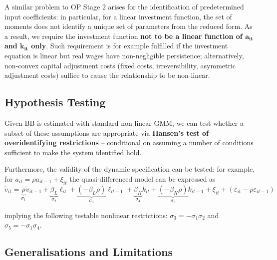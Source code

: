 \documentclass[11pt]{article}
\begin{document}
A similar problem to OP Stage 2 arises for the identification of predetermined input coefficients: in particular, for a linear investment function, the set of moments does not identify a unique set of parameters from the reduced form.
As a result, we require the investment function \textbf{not to be a linear function of $\mathbf{a_{it}}$ and $\mathbf{k_{it}}$ only}.
Such requirement is for example fulfilled if the investment equation is linear but real wages have non-negligible persistence; alternatively, non-convex capital adjustment costs (fixed costs, irreversibility, asymmetric adjustment costs) suffice to cause the relationship to be non-linear.

\subsection*{Hypothesis Testing}

Given BB is estimated with standard non-linear GMM, we can test whether a subset of these assumptions are appropriate via \textbf{Hansen's test of overidentifying restrictions} -- conditional on assuming a number of conditions sufficient to make the system identified hold.

Furthermore, the validity of the dynamic specification can be tested: for example, for $a_{it} = \rho a_{it-1} + \xi_{it}$ the quasi-differenced model can be expressed as
\begin{equation*}
		\tilde{v}_{it} = \underbrace{\rho}_{\sigma_1} \tilde{v}_{it-1} + \underbrace{\beta_L}_{\sigma_2} \ell_{it} + \underbrace{(- \beta_L\rho)}_{\sigma_3} \ell_{it-1} + \underbrace{\beta_K}_{\sigma_4} k_{it} + \underbrace{(- \beta_K \rho)}_{\sigma_5} k_{it-1} + \xi_{it} + (\varepsilon_{it} - \rho\varepsilon_{it-1})
\end{equation*}

implying the following testable nonlinear restrictions: $\sigma_3 = - \sigma_1 \sigma_2$ and $\sigma_5 = - \sigma_1 \sigma_4$.

\subsection*{Generalisations and Limitations}
\end{document}
